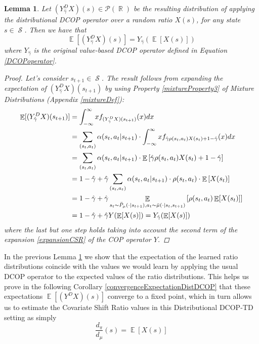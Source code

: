 \documentclass[12pt,a4paper,openright,twoside]{article}
\DeclareMathOperator*{\E}{\mathbb{E}}
\DeclareMathOperator*{\R}{\mathbb{R}}
\DeclareMathOperator*{\Sspace}{\mathcal{S}}
\numberwithin{equation}{section}
\newtheorem{lemma}[theorem]{Lemma}
\theoremstyle{definition}
\theoremstyle{remark}
\theoremstyle{plain}
\begin{document}
\begin{lemma} \label{expectationDistDCOPoperator}
	Let $(Y^D_{\hat{\gamma}} X)(s)\in \mathscr{P}(\R)$ be the resulting distribution of applying the distributional DCOP operator over a random ratio $X(s)$, for any state $s \in \Sspace$. Then we have that
	\begin{equation*}
		\E [(Y^D_{\hat{\gamma}} X)(s) ] = Y_{\hat{\gamma}} (\E [X(s)])
	\end{equation*}
	where $Y_{\hat{\gamma}}$ is the original value-based DCOP operator defined in Equation \ref{DCOPoperator}.%
\begin{proof}
Let's consider $s_{t+1} \in \Sspace$. The result follows from expanding the expectation of $(Y^D_{\hat{\gamma}} X)(s_{t+1})$ by using Property \ref{mixtureProperty3} of Mixture Distributions (Appendix \ref{mixtureDef}):
\begin{equation} \label{expDistCOP}
\begin{split}
    \E[(Y^D_{\hat{\gamma}}X)(s_{t+1})] &= \int_{-\infty}^{\infty} x f_{(Y^D_{\hat{\gamma}} X)(s_{t+1})}(x) dx \\
    &= \sum_{(s_{t},a_{t})} \alpha(s_{t},a_{t}|s_{t+1}) \cdot \int_{-\infty}^{\infty} x f_{\hat{\gamma}\rho(s_{t},a_{t}) X(s_{t}) +1 - \hat{\gamma}}(x) dx \\
    &= \sum_{(s_{t},a_{t})} \alpha(s_{t},a_{t}|s_{t+1}) \cdot \E \left[ \hat{\gamma}\rho(s_{t},a_{t}) X(s_{t}) +1 - \hat{\gamma} \right] \\
    &=  1 - \hat{\gamma} + \hat{\gamma} \sum_{(s_{t},a_{t})} \alpha(s_{t},a_{t}|s_{t+1}) \cdot \rho(s_{t},a_{t}) \cdot \E \left[X(s_{t}) \right]  \\
    &= 1 - \hat{\gamma} + \hat{\gamma} \E_{s_t \sim \Bar{P}_\mu (\cdot | s_{t+1}), a_t \sim \Bar{\mu}(\cdot|s_t,s_{t+1})} \left[ \rho(s_{t},a_{t}) \E[X(s_t)] \right] \\
    &= 1 - \hat{\gamma} + \hat{\gamma} Y (\E [X(s)]) = Y_{\hat{\gamma}} (\E [X(s)])
\end{split}
\end{equation}
where the last but one step holds taking into account the second term of the expansion \ref{expansionCSR} of the COP operator $Y$.
\end{proof}
\end{lemma}


In the previous Lemma \ref{expectationDistDCOPoperator} we show that the expectation of the learned ratio distributions coincide with the values we would learn by applying the usual DCOP operator to the expected values of the ratio distributions. This helps us prove in the following Corollary \ref{convergenceExpectationDistDCOP} that these expectations $\E[(Y^DX)(s)]$ converge to a fixed point, which in turn allows us to estimate the Covariate Shift Ratio values in this Distributional DCOP-TD setting as simply
\begin{equation*}
	\frac{d_\pi}{d_\mu}(s) = \E [X(s)]
\end{equation*}
\end{document}
